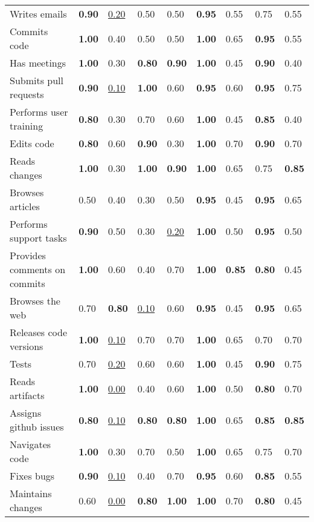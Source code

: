 \begin{tabular}{lllllllll}
Writes emails & \textbf{0.90} & \underline{0.20} & 0.50 & 0.50 & \textbf{0.95} & 0.55 & 0.75 & 0.55 \\
Commits code & \textbf{1.00} & 0.40 & 0.50 & 0.50 & \textbf{1.00} & 0.65 & \textbf{0.95} & 0.55 \\
Has meetings & \textbf{1.00} & 0.30 & \textbf{0.80} & \textbf{0.90} & \textbf{1.00} & 0.45 & \textbf{0.90} & 0.40 \\
Submits pull requests & \textbf{0.90} & \underline{0.10} & \textbf{1.00} & 0.60 & \textbf{0.95} & 0.60 & \textbf{0.95} & 0.75 \\
Performs user training & \textbf{0.80} & 0.30 & 0.70 & 0.60 & \textbf{1.00} & 0.45 & \textbf{0.85} & 0.40 \\
Edits code & \textbf{0.80} & 0.60 & \textbf{0.90} & 0.30 & \textbf{1.00} & 0.70 & \textbf{0.90} & 0.70 \\
Reads changes & \textbf{1.00} & 0.30 & \textbf{1.00} & \textbf{0.90} & \textbf{1.00} & 0.65 & 0.75 & \textbf{0.85} \\
Browses articles & 0.50 & 0.40 & 0.30 & 0.50 & \textbf{0.95} & 0.45 & \textbf{0.95} & 0.65 \\
Performs support tasks & \textbf{0.90} & 0.50 & 0.30 & \underline{0.20} & \textbf{1.00} & 0.50 & \textbf{0.95} & 0.50 \\
Provides comments on commits & \textbf{1.00} & 0.60 & 0.40 & 0.70 & \textbf{1.00} & \textbf{0.85} & \textbf{0.80} & 0.45 \\
Browses the web & 0.70 & \textbf{0.80} & \underline{0.10} & 0.60 & \textbf{0.95} & 0.45 & \textbf{0.95} & 0.65 \\
Releases code versions & \textbf{1.00} & \underline{0.10} & 0.70 & 0.70 & \textbf{1.00} & 0.65 & 0.70 & 0.70 \\
Tests & 0.70 & \underline{0.20} & 0.60 & 0.60 & \textbf{1.00} & 0.45 & \textbf{0.90} & 0.75 \\
Reads artifacts & \textbf{1.00} & \underline{0.00} & 0.40 & 0.60 & \textbf{1.00} & 0.50 & \textbf{0.80} & 0.70 \\
Assigns github issues & \textbf{0.80} & \underline{0.10} & \textbf{0.80} & \textbf{0.80} & \textbf{1.00} & 0.65 & \textbf{0.85} & \textbf{0.85} \\
Navigates code & \textbf{1.00} & 0.30 & 0.70 & 0.50 & \textbf{1.00} & 0.65 & 0.75 & 0.70 \\
Fixes bugs & \textbf{0.90} & \underline{0.10} & 0.40 & 0.70 & \textbf{0.95} & 0.60 & \textbf{0.85} & 0.55 \\
Maintains changes & 0.60 & \underline{0.00} & \textbf{0.80} & \textbf{1.00} & \textbf{1.00} & 0.70 & \textbf{0.80} & 0.45 \\

\end{tabular}
